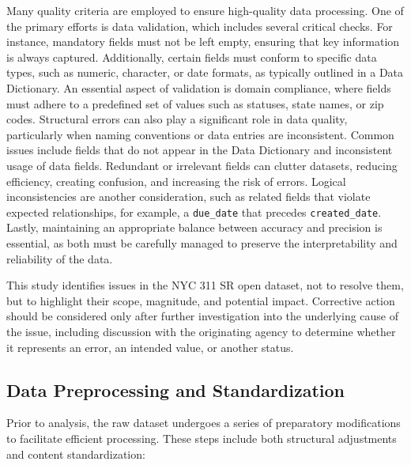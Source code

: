 \documentclass[linenumber]{jdsart}
\begin{document}
Many quality criteria are employed to ensure high-quality data 
processing. One of the primary efforts is data validation, which includes 
several critical checks. For instance, mandatory fields must not be 
left empty, ensuring that key information is always captured. 
Additionally, certain fields must conform to specific data types,
such as numeric, character, or date formats,
as typically outlined in a Data Dictionary. An essential aspect of 
validation is domain compliance, where fields must adhere to a predefined set of 
values such as statuses, state names, or zip codes. Structural 
errors can also play a significant role in data quality, particularly when 
naming conventions or data entries are inconsistent. Common issues 
include fields that do not appear in the Data Dictionary and  
inconsistent usage of data fields. Redundant or irrelevant fields can 
clutter datasets, reducing efficiency, creating confusion, and 
increasing the risk of errors. Logical inconsistencies 
are another consideration, such as related fields that violate expected 
relationships, for example, a \texttt{due\_date} that 
precedes \texttt{created\_date}. Lastly, maintaining an 
appropriate balance between accuracy and precision 
is essential, as both must be carefully managed to preserve 
the interpretability and reliability of the data.


This study identifies issues in the NYC 311 SR open dataset,
not to resolve them, but to highlight their scope, magnitude, 
and potential impact. Corrective action should be considered only after further
investigation into the underlying cause of the issue,
including discussion with the originating agency to determine
whether it represents an error, an intended value, or
another status.



\subsection{Data Preprocessing and Standardization}
\label{subsec:premodifications}
Prior to analysis, the raw dataset undergoes a series of
preparatory modifications to facilitate efficient processing.
These steps include both structural adjustments and content standardization:
\end{document}
